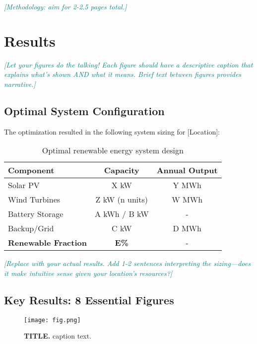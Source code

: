 \documentclass[11pt,letterpaper]{article}
\newcommand{\hint}[1]{\textcolor{teal}{\small\textit{[#1]}}}
\begin{document}
\hint{Methodology: aim for 2-2.5 pages total.}

\section{Results}

\hint{Let your figures do the talking! Each figure should have a descriptive caption that explains what's shown AND what it means. Brief text between figures provides narrative.}

\subsection{Optimal System Configuration}

The optimization resulted in the following system sizing for [Location]:

\begin{table}[h]
\centering
\caption{Optimal renewable energy system design}
\begin{tabular}{@{}lcc@{}}
\toprule
\textbf{Component} & \textbf{Capacity} & \textbf{Annual Output} \\
\midrule
Solar PV & X kW & Y MWh \\
Wind Turbines & Z kW (n units) & W MWh \\
Battery Storage & A kWh / B kW & - \\
Backup/Grid & C kW & D MWh \\
\midrule
\textbf{Renewable Fraction} & \textbf{E\%} & - \\
\bottomrule
\end{tabular}
\end{table}

\hint{Replace with your actual results. Add 1-2 sentences interpreting the sizing—does it make intuitive sense given your location's resources?}

\subsection{Key Results: 8 Essential Figures}

\begin{figure}[h]
    \centering
    \texttt{[image: fig.png]}
    \caption{\textbf{TITLE.} caption text.}
    \label{fig:1}
\end{figure}
\end{document}
